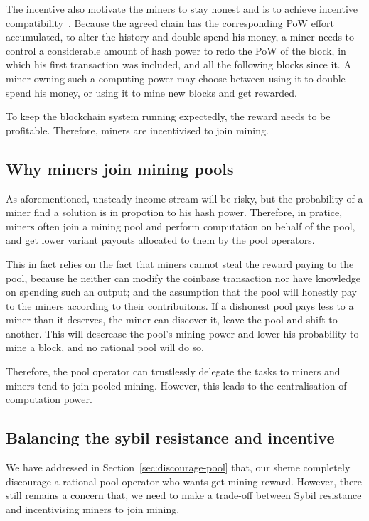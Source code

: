 The incentive also motivate the miners to stay honest and is to achieve incentive compatibility~\cite{}.
Because the agreed chain has the corresponding PoW effort accumulated, to alter the history and double-spend his money, a miner needs to control a considerable amount of hash power to redo the PoW of the block, in which his first transaction was included, and all the following blocks since it.
A miner owning such a computing power may choose between using it to double spend his money, or using it to mine new blocks and get rewarded. 

To keep the blockchain system running expectedly, the reward needs to be profitable.
Therefore, miners are incentivised to join mining.

\subsection{Why miners join mining pools}

As aforementioned, unsteady income stream will be risky, but the probability of a miner find a solution is in propotion to his hash power.
Therefore, in pratice, miners often join a mining pool and perform computation on behalf of the pool, and get lower variant payouts allocated to them by the pool operators.

This in fact relies on the fact that miners cannot steal the reward paying to the pool, because he neither can modify the coinbase transaction nor have knowledge on spending such an output;
and the assumption that the pool will honestly pay to the miners according to their contribuitons.
If a dishonest pool pays less to a miner than it deserves, the miner can discover it, leave the pool and shift to another.
This will descrease the pool's mining power and lower his probability to mine a block, and no rational pool will do so.

Therefore, the pool operator can trustlessly delegate the tasks to miners and miners tend to join pooled mining.
However, this leads to the centralisation of computation power.

\subsection{Balancing the sybil resistance and incentive}

We have addressed in Section~\ref{sec:discourage-pool} that, our sheme completely discourage a rational pool operator who wants get mining reward.
However, there still remains a concern that, we need to make a trade-off between Sybil resistance and incentivising miners to join mining.

